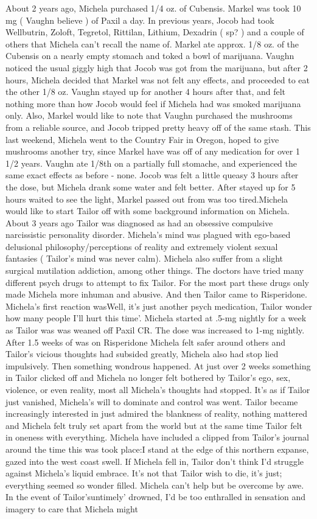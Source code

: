 \documentclass[12pt]{book}
\begin{document}
About 2 years ago, Michela purchased 1/4 oz. of Cubensis. Markel was took 10 mg ( Vaughn believe ) of Paxil a day. In previous years, Jocob had took Wellbutrin, Zoloft, Tegretol, Rittilan, Lithium, Dexadrin ( sp? ) and a couple of others that Michela can't recall the name of. Markel ate approx. 1/8 oz. of the Cubensis on a nearly empty stomach and toked a bowl of marijuana. Vaughn noticed the usual giggly high that Jocob was got from the marijuana, but after 2 hours, Michela decided that Markel was not felt any effects, and proceeded to eat the other 1/8 oz. Vaughn stayed up for another 4 hours after that, and felt nothing more than how Jocob would feel if Michela had was smoked marijuana only. Also, Markel would like to note that Vaughn purchased the mushrooms from a reliable source, and Jocob tripped pretty heavy off of the same stash. This last weekend, Michela went to the Country Fair in Oregon, hoped to give mushrooms another try, since Markel have was off of any medication for over 1 1/2 years. Vaughn ate 1/8th on a partially full stomache, and experienced the same exact effects as before - none. Jocob was felt a little queasy 3 hours after the dose, but Michela drank some water and felt better. After stayed up for 5 hours waited to see the light, Markel passed out from was too tired.Michela would like to start Tailor off with some background information on Michela. About 3 years ago Tailor was diagnosed as had an obsessive compulsive narcissistic personality disorder. Michela's mind was plagued with ego-based delusional philosophy/perceptions of reality and extremely violent sexual fantasies ( Tailor's mind was never calm). Michela also suffer from a slight surgical mutilation addiction, among other things. The doctors have tried many different psych drugs to attempt to fix Tailor. For the most part these drugs only made Michela more inhuman and abusive. And then Tailor came to Risperidone. Michela's first reaction wasWell, it's just another psych medication, Tailor wonder how many people I'll hurt this time'. Michela started at .5-mg nightly for a week as Tailor was was weaned off Paxil CR. The dose was increased to 1-mg nightly. After 1.5 weeks of was on Risperidone Michela felt safer around others and Tailor's vicious thoughts had subsided greatly, Michela also had stop lied impulsively. Then something wondrous happened. At just over 2 weeks something in Tailor clicked off and Michela no longer felt bothered by Tailor's ego, sex, violence, or even reality, most all Michela's thoughts had stopped. It's as if Tailor just vanished, Michela's will to dominate and control was went. Tailor became increasingly interested in just admired the blankness of reality, nothing mattered and Michela felt truly set apart from the world but at the same time Tailor felt in oneness with everything. Michela have included a clipped from Tailor's journal around the time this was took place:I stand at the edge of this northern expanse, gazed into the west coast swell. If Michela fell in, Tailor don't think I'd struggle against Michela's liquid embrace. It's not that Tailor wish to die, it's just; everything seemed so wonder filled. Michela can't help but be overcome by awe. In the event of Tailor'suntimely' drowned, I'd be too enthralled in sensation and imagery to care that Michela might 
\end{document}
